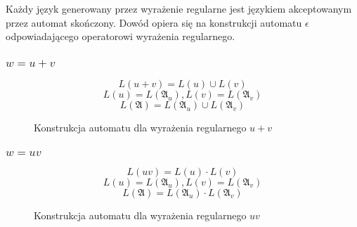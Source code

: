 \documentclass{../notatki}
\begin{document}
Każdy język generowany przez wyrażenie regularne jest językiem akceptowanym przez automat skończony.
Dowód opiera się na konstrukcji automatu $\epsilon$ odpowiadającego operatorowi wyrażenia regularnego.

\subsubsection{\texorpdfstring{$w = u + v$}{w = u + v}}

$$
L(u + v) = L(u) \cup L(v)
$$
$$
L(u) = L(\mathfrak{A}_u), L(v) = L(\mathfrak{A}_v)
$$
$$
L(\mathfrak{A}) = L(\mathfrak{A}_u) \cup L(\mathfrak{A}_v)
$$

\begin{figure}[H]
    \centering
    \caption{Konstrukcja automatu dla wyrażenia regularnego $u + v$}
    \label{fig:reg:plus}
\end{figure}

\subsubsection{\texorpdfstring{$w = uv$}{w = u}}

$$
L(uv) = L(u) \cdot L(v)
$$
$$
L(u) = L(\mathfrak{A}_u), L(v) = L(\mathfrak{A}_v)
$$
$$
L(\mathfrak{A}) = L(\mathfrak{A}_u) \cdot L(\mathfrak{A}_v)
$$

\begin{figure}[H]
    \centering
    \caption{Konstrukcja automatu dla wyrażenia regularnego $uv$}
    \label{fig:reg:concat}
\end{figure}
\end{document}
